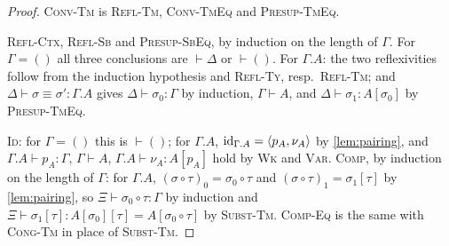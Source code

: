 \begin{proof}
    \textsc{Conv-Tm} is \textsc{Refl-Tm}, \textsc{Conv-TmEq} and \textsc{Presup-TmEq}.

    \textsc{Refl-Ctx}, \textsc{Refl-Sb} and \textsc{Presup-SbEq}, by induction on the length of $\Gamma$. For $\Gamma = ()$ all three conclusions are $\vdash \Delta$ or $\vdash ()$. For $\Gamma.A$: the two reflexivities follow from the induction hypothesis and \textsc{Refl-Ty}, resp.\ \textsc{Refl-Tm}; and $\Delta \vdash \sigma \equiv \sigma' : \Gamma.A$ gives $\Delta \vdash \sigma_0 : \Gamma$ by induction, $\Gamma \vdash A$, and $\Delta \vdash \sigma_1 : A[\sigma_0]$ by \textsc{Presup-TmEq}.

    \textsc{Id}: for $\Gamma = ()$ this is $\vdash ()$; for $\Gamma.A$, $\mathrm{id}_{\Gamma.A} = \langle p_A, \nu_A \rangle$ by \cref{lem:pairing}, and $\Gamma.A \vdash p_A : \Gamma$, $\Gamma \vdash A$, $\Gamma.A \vdash \nu_A : A[p_A]$ hold by \textsc{Wk} and \textsc{Var}. \textsc{Comp}, by induction on the length of $\Gamma$: for $\Gamma.A$, $(\sigma \circ \tau)_0 = \sigma_0 \circ \tau$ and $(\sigma \circ \tau)_1 = \sigma_1[\tau]$ by \cref{lem:pairing}, so $\Xi \vdash \sigma_0 \circ \tau : \Gamma$ by induction and $\Xi \vdash \sigma_1[\tau] : A[\sigma_0][\tau] = A[\sigma_0 \circ \tau]$ by \textsc{Subst-Tm}. \textsc{Comp-Eq} is the same with \textsc{Cong-Tm} in place of \textsc{Subst-Tm}.


\end{proof}
